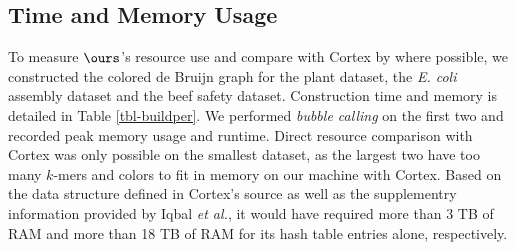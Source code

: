 
\subsection{Time and Memory Usage}

To measure $\ours$'s resource use and compare with {\sc Cortex} by \cite{ICTFM12} where possible, we constructed the colored de Bruijn graph for the plant dataset, the \emph{E. coli} assembly dataset and the beef safety dataset. Construction time and memory is detailed in Table \ref{tbl-buildper}. We performed {\em bubble calling} on the first two and recorded peak memory usage and runtime.  Direct resource comparison with {\sc Cortex} was only possible on the smallest  dataset, as the largest two have too many $k$-mers and colors to fit in memory on our machine with {\sc Cortex}.  Based on the data structure defined in {\sc Cortex}'s source as well as the supplementry information provided by Iqbal {\it et al.}, it would have required more than 3 TB of RAM and more than 18 TB of RAM for its hash table entries alone, respectively.









